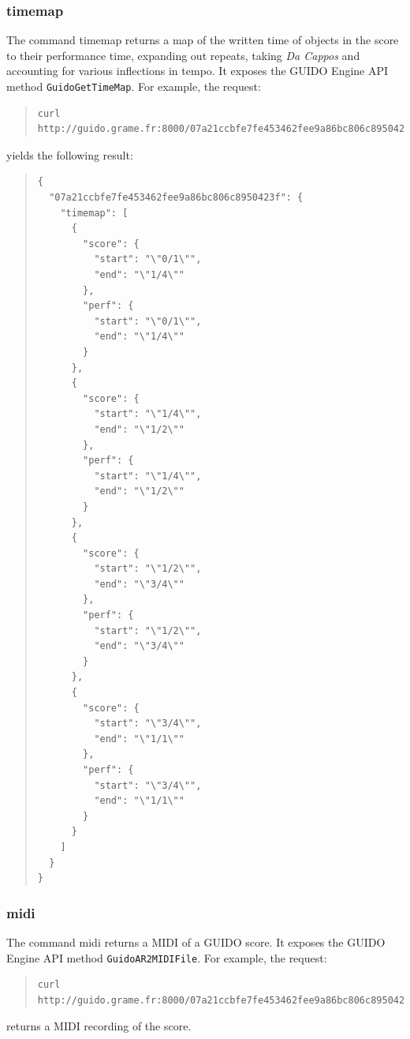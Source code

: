 \documentclass[a4paper]{article}
\begin{document}
\subsubsection{timemap}
The command timemap returns a map of the written time of objects in the score to their performance time, expanding out repeats, taking \emph{Da Cappos} and accounting for various inflections in tempo.  It exposes the GUIDO Engine API method \verb=GuidoGetTimeMap=.  For example, the request:
\begin{quote}
\begingroup
\fontsize{7.5pt}{12pt}\selectfont
\begin{verbatim}
curl http://guido.grame.fr:8000/07a21ccbfe7fe453462fee9a86bc806c8950423f/timemap
\end{verbatim}
\endgroup
\end{quote}
yields the following result:
\begin{quote}
\begin{verbatim}
{
  "07a21ccbfe7fe453462fee9a86bc806c8950423f": {
    "timemap": [
      {
        "score": {
          "start": "\"0/1\"",
          "end": "\"1/4\""
        },
        "perf": {
          "start": "\"0/1\"",
          "end": "\"1/4\""
        }
      },
      {
        "score": {
          "start": "\"1/4\"",
          "end": "\"1/2\""
        },
        "perf": {
          "start": "\"1/4\"",
          "end": "\"1/2\""
        }
      },
      {
        "score": {
          "start": "\"1/2\"",
          "end": "\"3/4\""
        },
        "perf": {
          "start": "\"1/2\"",
          "end": "\"3/4\""
        }
      },
      {
        "score": {
          "start": "\"3/4\"",
          "end": "\"1/1\""
        },
        "perf": {
          "start": "\"3/4\"",
          "end": "\"1/1\""
        }
      }
    ]
  }
}
\end{verbatim}
\end{quote}

\subsubsection{midi}
The command midi returns a MIDI of a GUIDO score.  It exposes the GUIDO Engine API method \verb=GuidoAR2MIDIFile=.  For example, the request:
\begin{quote}
\begingroup
\fontsize{7.5pt}{12pt}\selectfont
\begin{verbatim}
curl http://guido.grame.fr:8000/07a21ccbfe7fe453462fee9a86bc806c8950423f/midi
\end{verbatim}
\endgroup
\end{quote}
returns a MIDI recording of the score.
\end{document}
